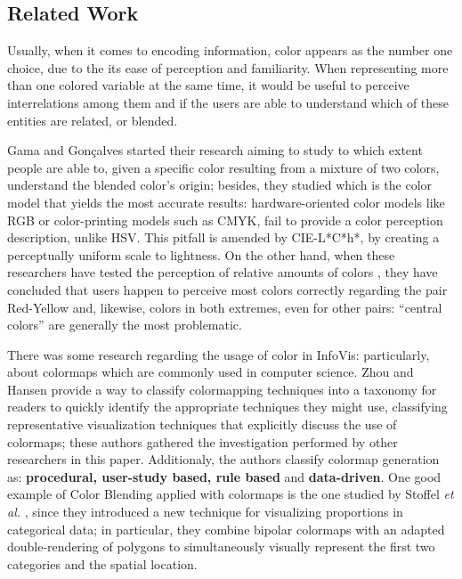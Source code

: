 \subsection{Related Work}
%
Usually, when it comes to encoding information, color appears as the number one choice, due to the its ease of perception and
familiarity. When representing more than one colored variable at the same time, it would be useful to perceive interrelations
among them and if the users are able to understand which of these entities are related, or blended. \par
%
Gama and Gonçalves started their research \cite{Gama20141} aiming to study to which extent people are able to, given a specific
color resulting from a mixture of two colors, understand the blended color’s origin; besides, they studied which is the color
model that yields the most accurate results: hardware-oriented color models like RGB or color-printing models such as CMYK,
fail to provide a color perception description, unlike HSV. This pitfall is amended by CIE-L*C*h*, by creating a perceptually
uniform scale to lightness. On the other hand, when these researchers have tested the perception of relative amounts of colors
\cite{Gama20142}, they have concluded that users happen to perceive most colors correctly regarding the pair Red-Yellow and,
likewise, colors in both extremes, even for other pairs: “central colors” are generally the most problematic.\par
%
There was some research regarding the usage of color in InfoVis: particularly, about colormaps which are commonly used
in computer science. Zhou and Hansen \cite{Zhou2016} provide a way to classify colormapping techniques into
a taxonomy for readers to quickly identify the appropriate techniques they might use, classifying representative
visualization techniques that explicitly discuss the use of colormaps; these authors gathered the investigation
performed by other researchers in this paper. Additionaly, the authors classify colormap generation as:
\textbf{procedural, user-study based, rule based} and \textbf{data-driven}. One good example of Color Blending
applied with colormaps is the one studied by Stoffel \emph{et al.} \cite{Stoffel2012}, since they introduced a
new technique for visualizing proportions in categorical data; in particular, they combine bipolar colormaps
with an adapted double-rendering of polygons to simultaneously visually represent the first two categories
and the spatial location.
